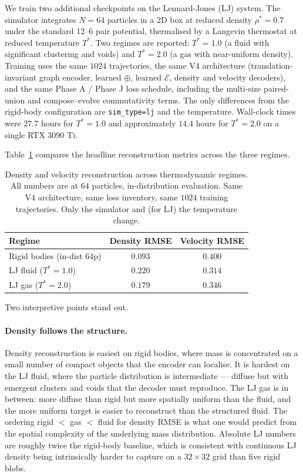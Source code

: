 \documentclass[11pt]{article}
\newcommand{\combine}{\oplus}
\newcommand{\evolve}{\mathcal{E}}
\begin{document}
We train two additional checkpoints on the Lennard-Jones (LJ) system. The simulator integrates $N = 64$ particles in a $2$D box at reduced density $\rho^* = 0.7$ under the standard $12$--$6$ pair potential, thermalised by a Langevin thermostat at reduced temperature $T^*$. Two regimes are reported: $T^* = 1.0$ (a fluid with significant clustering and voids) and $T^* = 2.0$ (a gas with near-uniform density). Training uses the same $1024$ trajectories, the same V4 architecture (translation-invariant graph encoder, learned $\combine$, learned $\evolve$, density and velocity decoders), and the same Phase A / Phase J loss schedule, including the multi-size paired-union and compose--evolve commutativity terms. The only differences from the rigid-body configuration are \verb|sim_type=lj| and the temperature. Wall-clock times were $27.7$ hours for $T^* = 1.0$ and approximately $14.4$ hours for $T^* = 2.0$ on a single RTX 3090 Ti.

Table~\ref{tab:lj} compares the headline reconstruction metrics across the three regimes.

\begin{table}[t]
\centering
\caption{Density and velocity reconstruction across thermodynamic regimes. All numbers are at $64$ particles, in-distribution evaluation. Same V4 architecture, same loss inventory, same $1024$ training trajectories. Only the simulator and (for LJ) the temperature change.}
\label{tab:lj}
\begin{tabular}{lcc}
\toprule
Regime & Density RMSE & Velocity RMSE \\
\midrule
Rigid bodies (in-dist $64$p) & $\mathbf{0.093}$ & $0.400$ \\
LJ fluid ($T^* = 1.0$) & $0.220$ & $\mathbf{0.314}$ \\
LJ gas ($T^* = 2.0$) & $0.179$ & $0.346$ \\
\bottomrule
\end{tabular}
\end{table}

Two interpretive points stand out.

\paragraph{Density follows the structure.} Density reconstruction is easiest on rigid bodies, where mass is concentrated on a small number of compact objects that the encoder can localise. It is hardest on the LJ fluid, where the particle distribution is intermediate --- diffuse but with emergent clusters and voids that the decoder must reproduce. The LJ gas is in between: more diffuse than rigid but more spatially uniform than the fluid, and the more uniform target is easier to reconstruct than the structured fluid. The ordering rigid $<$ gas $<$ fluid for density RMSE is what one would predict from the spatial complexity of the underlying mass distribution. Absolute LJ numbers are roughly twice the rigid-body baseline, which is consistent with continuous LJ density being intrinsically harder to capture on a $32 \times 32$ grid than five rigid blobs.
\end{document}
